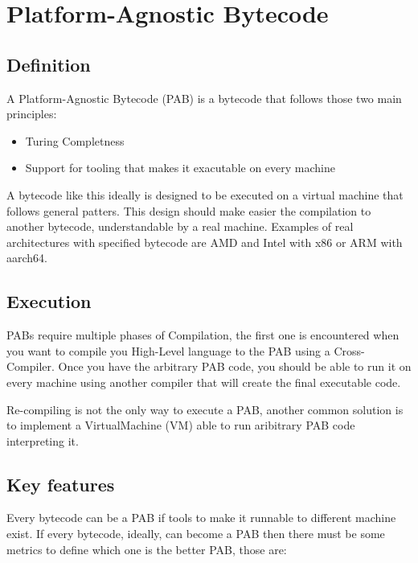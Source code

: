 \documentclass[../main.tex]{subfiles}
\begin{document}
\section{Platform-Agnostic Bytecode}
\subsection{Definition}

A Platform-Agnostic Bytecode (PAB) is a bytecode that follows those two main principles:

\begin{itemize}
    \item Turing Completness
    \item Support for tooling that makes it exacutable on every machine
\end{itemize}

A bytecode like this ideally is designed to be executed on a virtual machine that follows general patters. This design should make easier the compilation to another bytecode, understandable by a real machine. Examples of real architectures with specified bytecode are AMD and Intel with x86 or ARM with aarch64. %

\subsection{Execution}

PABs require multiple phases of Compilation, the first one is encountered when you want to compile you High-Level language to the PAB using a Cross-Compiler. Once you have the arbitrary PAB code, you should be able to run it on every machine using another compiler that will create the final executable code.

Re-compiling is not the only way to execute a PAB, another common solution is to implement a VirtualMachine (VM) able to run aribitrary PAB code interpreting it.

\subsection{Key features}

Every bytecode can be a PAB if tools to make it runnable to different machine exist. If every bytecode, ideally, can become a PAB then there must be some metrics to define which one is the better PAB, those are:
\end{document}
